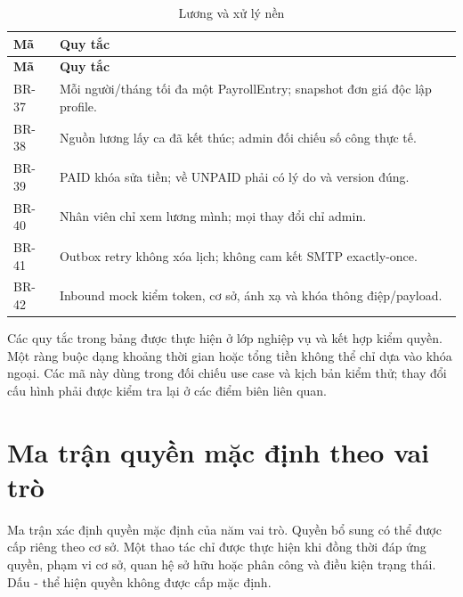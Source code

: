 {\small\setlength{\tabcolsep}{3pt}\renewcommand{\arraystretch}{1.12}
\begin{longtable}{@{}L{\textwidth-0.72pt\relax} L{\textwidth-5.28pt\relax}@{}}
\caption{Lương và xử lý nền}\\
\toprule
\textbf{Mã} & \textbf{Quy tắc}\\\midrule
\endfirsthead
\toprule
\textbf{Mã} & \textbf{Quy tắc}\\\midrule
\endhead
\bottomrule\endlastfoot
BR-37 & Mỗi người/\allowbreak{}tháng tối đa một Payroll\allowbreak{}Entry; snapshot đơn giá độc lập profile.\allowbreak{}\\[3pt]
BR-38 & Nguồn lương lấy ca đã kết thúc; admin đối chiếu số công thực tế.\allowbreak{}\\[3pt]
BR-39 & PAID khóa sửa tiền; về UNPAID phải có lý do và version đúng.\allowbreak{}\\[3pt]
BR-40 & Nhân viên chỉ xem lương mình; mọi thay đổi chỉ admin.\allowbreak{}\\[3pt]
BR-41 & Outbox retry không xóa lịch; không cam kết SMTP exactly-once.\allowbreak{}\\[3pt]
BR-42 & Inbound mock kiểm token, cơ sở, ánh xạ và khóa thông điệp/\allowbreak{}payload.\allowbreak{}\\[3pt]
\end{longtable}}
Các quy tắc trong bảng được thực hiện ở lớp nghiệp vụ và kết hợp kiểm quyền.\allowbreak{} Một ràng buộc dạng khoảng thời gian hoặc tổng tiền không thể chỉ dựa vào khóa ngoại.\allowbreak{} Các mã này dùng trong đối chiếu use case và kịch bản kiểm thử; thay đổi cấu hình phải được kiểm tra lại ở các điểm biên liên quan.\allowbreak{}

\clearpage

\section{Ma trận quyền mặc định theo vai trò}
Ma trận xác định quyền mặc định của năm vai trò.\allowbreak{} Quyền bổ sung có thể được cấp riêng theo cơ sở.\allowbreak{} Một thao tác chỉ được thực hiện khi đồng thời đáp ứng quyền, phạm vi cơ sở, quan hệ sở hữu hoặc phân công và điều kiện trạng thái.\allowbreak{} Dấu - thể hiện quyền không được cấp mặc định.\allowbreak{}


